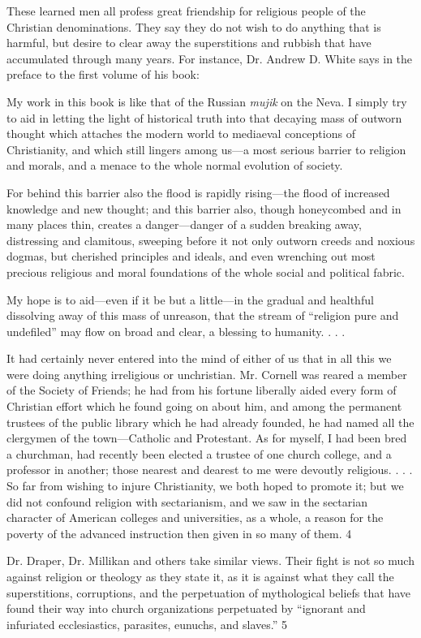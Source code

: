 These learned men all profess great friendship for religious people of the Christian
denominations. They say they do not wish to do anything that is harmful, but desire to clear
away the superstitions and rubbish that have accumulated through many years. For instance,
Dr. Andrew D. White says in the preface to the first volume of his book:

My work in this book is like that of the Russian \textit{mujik} on the Neva. I simply try to aid in
letting the light of historical truth into that decaying mass of outworn thought which attaches
the modern world to mediaeval conceptions of Christianity, and which still lingers among
us—a most serious barrier to religion and morals, and a menace to the whole normal
evolution of society.

For behind this barrier also the flood is rapidly rising—the flood of increased knowledge and
new thought; and this barrier also, though honeycombed and in many places thin, creates a
danger—danger of a sudden breaking away, distressing and clamitous, sweeping before it not
only outworn creeds and noxious dogmas, but cherished principles and ideals, and even
wrenching out most precious religious and moral foundations of the whole social and
political fabric.

My hope is to aid—even if it be but a little—in the gradual and healthful dissolving away of
this mass of unreason, that the stream of ``religion pure and undefiled'' may flow on broad
and clear, a blessing to humanity. . . .

It had certainly never entered into the mind of either of us that in all this we were doing
anything irreligious or unchristian. Mr. Cornell was reared a member of the Society of
Friends; he had from his fortune liberally aided every form of Christian effort which he
found going on about him, and among the permanent trustees of the public library which he
had already founded, he had named all the clergymen of the town—Catholic and Protestant.
As for myself, I had been bred a churchman, had recently been elected a trustee of one
church college, and a professor in another; those nearest and dearest to me were devoutly
religious. . . . So far from wishing to injure Christianity, we both hoped to promote it; but we
did not confound religion with sectarianism, and we saw in the sectarian character of
American colleges and universities, as a whole, a reason for the poverty of the advanced
instruction then given in so many of them. 4

Dr. Draper, Dr. Millikan and others take similar views. Their fight is not so much against
religion or theology as they state it, as it is against what they call the superstitions,
corruptions, and the perpetuation of mythological beliefs that have found their way into
church organizations perpetuated by ``ignorant and infuriated ecclesiastics, parasites,
eunuchs, and slaves.'' 5

